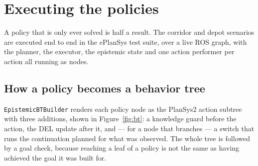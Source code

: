 \documentclass[11pt,a4paper]{article}
\begin{document}
\section{Executing the policies}
\label{sec:execution}

A policy that is only ever solved is half a result. The corridor and depot
scenarios are executed end to end in the ePlanSys test suite, over a live ROS
graph, with the planner, the executor, the epistemic state and one action
performer per action all running as nodes.

\subsection{How a policy becomes a behavior tree}

\texttt{EpistemicBTBuilder} renders each policy node as the PlanSys2 action
subtree with three additions, shown in Figure~\ref{fig:bt}: a knowledge guard
before the action, the DEL update after it, and --- for a node that branches ---
a switch that runs the continuation planned for what was observed. The whole
tree is followed by a goal check, because reaching a leaf of a policy is not the
same as having achieved the goal it was built for.
\end{document}
